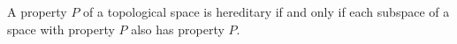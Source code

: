 A property $P$ of a topological space is hereditary if and only if each subspace of a space with property $P$ also has property $P$.
